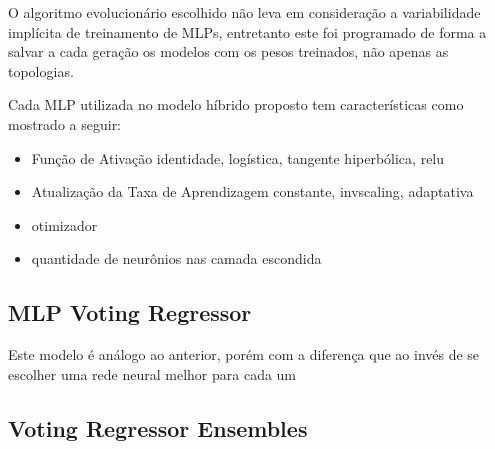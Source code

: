O algoritmo evolucionário escolhido não leva em consideração a variabilidade implícita de treinamento de MLPs, entretanto este foi programado de forma a salvar a cada geração os modelos com os pesos treinados, não apenas as topologias.

Cada MLP utilizada no modelo híbrido proposto tem características como mostrado a seguir:
\begin{itemize}
    \item Função de Ativação {identidade, logística, tangente hiperbólica,
relu}
    \item Atualização da Taxa de Aprendizagem {constante, invscaling,
adaptativa}
    \item otimizador
    \item quantidade de neurônios nas camada escondida
\end{itemize}

\subsection{MLP Voting Regressor}

Este modelo é análogo ao anterior, porém com a diferença que ao invés de se escolher uma rede neural melhor para cada um 

\subsection{Voting Regressor Ensembles}
